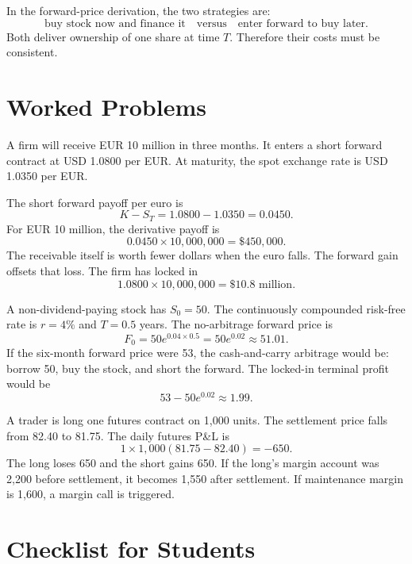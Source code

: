 In the forward-price derivation, the two strategies are:
\[
    \text{buy stock now and finance it}
    \quad \text{versus} \quad
    \text{enter forward to buy later}.
\]
Both deliver ownership of one share at time $T$. Therefore their costs must be
consistent.

\section{Worked Problems}

\begin{exmp}
A firm will receive EUR 10 million in three months. It enters a short forward
contract at USD 1.0800 per EUR. At maturity, the spot exchange rate is USD
1.0350 per EUR.

The short forward payoff per euro is
\[
    K-S_T = 1.0800-1.0350 = 0.0450.
\]
For EUR 10 million, the derivative payoff is
\[
    0.0450 \times 10{,}000{,}000 = \$450{,}000.
\]
The receivable itself is worth fewer dollars when the euro falls. The forward
gain offsets that loss. The firm has locked in
\[
    1.0800 \times 10{,}000{,}000 = \$10.8\text{ million}.
\]
\end{exmp}

\begin{exmp}
A non-dividend-paying stock has $S_0=50$. The continuously compounded risk-free
rate is $r=4\%$ and $T=0.5$ years. The no-arbitrage forward price is
\[
    F_0 = 50e^{0.04\times 0.5}
    = 50e^{0.02}
    \approx 51.01.
\]
If the six-month forward price were 53, the cash-and-carry arbitrage would be:
borrow 50, buy the stock, and short the forward. The locked-in terminal profit
would be
\[
    53-50e^{0.02} \approx 1.99.
\]
\end{exmp}

\begin{exmp}
A trader is long one futures contract on 1,000 units. The settlement price falls
from 82.40 to 81.75. The daily futures P\&L is
\[
    1 \times 1{,}000(81.75-82.40)=-650.
\]
The long loses 650 and the short gains 650. If the long's margin account was
2,200 before settlement, it becomes 1,550 after settlement. If maintenance
margin is 1,600, a margin call is triggered.
\end{exmp}

\section{Checklist for Students}

